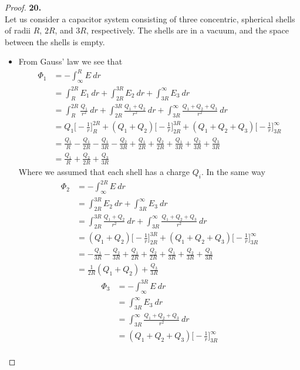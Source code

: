 \documentclass[11pt]{article}
\theoremstyle{definition}
\begin{document}
\cleardoublepage
\begin{proof}{\textbf{20.}}\\
Let us consider a capacitor system consisting of three concentric, spherical
shells of radii $R$, $2R$, and $3R$, respectively.
The shells are in a vacuum, and the space between the shells is empty.
\begin{itemize}
\item [(a)] From Gauss' law we see that
\begin{align*}
\Phi_1 &= -\int_{\infty}^{R} E~dr\\
    &= \int_R^{2R} E_1~dr + \int_{2R}^{3R} E_2~dr + \int_{3R}^{\infty} E_3~dr\\
    &= \int_R^{2R} \frac{Q_1}{r^2}~dr
    + \int_{2R}^{3R} \frac{Q_1 + Q_2}{r^2}~dr
    + \int_{3R}^{\infty} \frac{Q_1 + Q_2 + Q_3}{r^2}~dr\\
    &= Q_1\bigg[-\frac{1}{r}\bigg]_R^{2R}
    + (Q_1 + Q_2)\bigg[-\frac{1}{r}\bigg]_{2R}^{3R}
    + (Q_1 + Q_2 + Q_3)\bigg[-\frac{1}{r}\bigg]_{3R}^{\infty}\\
    &= \frac{Q_1}{R} -\frac{Q_1}{2R}
    - \frac{Q_1}{3R} - \frac{Q_2}{3R} + \frac{Q_1}{2R} + \frac{Q_2}{2R}
    + \frac{Q_1}{3R} + \frac{Q_2}{3R} + \frac{Q_3}{3R}\\
    &= \frac{Q_1}{R} + \frac{Q_2}{2R} + \frac{Q_3}{3R}
\end{align*}
Where we assumed that each shell has a charge $Q_i$. In the same way
\begin{align*}
\Phi_2 &= -\int_{\infty}^{2R} E~dr\\
    &= \int_{2R}^{3R} E_2~dr + \int_{3R}^{\infty} E_3~dr\\
    &= \int_{2R}^{3R} \frac{Q_1 + Q_2}{r^2}~dr
    + \int_{3R}^{\infty} \frac{Q_1 + Q_2 + Q_3}{r^2}~dr\\
    &= (Q_1 + Q_2)\bigg[-\frac{1}{r}\bigg]_{2R}^{3R}
    + (Q_1 + Q_2 + Q_3)\bigg[-\frac{1}{r}\bigg]_{3R}^{\infty}\\
    &= - \frac{Q_1}{3R} - \frac{Q_2}{3R} + \frac{Q_1}{2R} + \frac{Q_2}{2R}
    + \frac{Q_1}{3R} + \frac{Q_2}{3R} + \frac{Q_3}{3R}\\
    &= \frac{1}{2R}(Q_1 + Q_2) + \frac{Q_3}{3R}
\end{align*}
\begin{align*}
\Phi_3 &= -\int_{\infty}^{3R} E~dr\\
    &= \int_{3R}^{\infty} E_3~dr\\
    &= \int_{3R}^{\infty} \frac{Q_1 + Q_2 + Q_3}{r^2}~dr\\
    &= (Q_1 + Q_2 + Q_3)\bigg[-\frac{1}{r}\bigg]_{3R}^{\infty}\\

\end{align*}
\end{itemize}
\end{proof}
\end{document}
